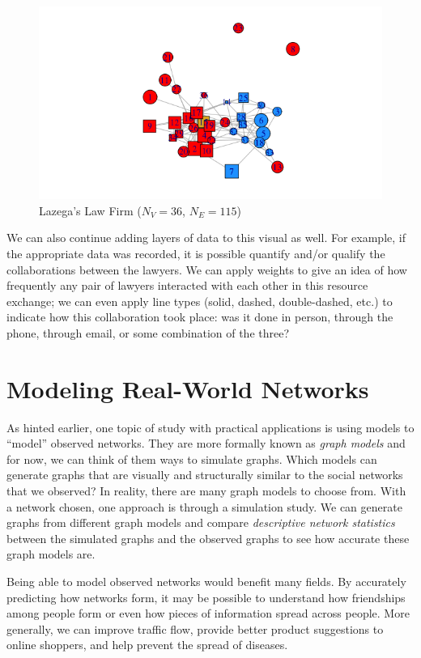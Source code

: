 \documentclass[12pt,twoside]{amherstthesis}
\begin{document}
  \begin{figure}[htbp]
  \centering
  \includegraphics{figure/02lawyerplot.png}
  \caption{Lazega's Law Firm (\(N_V = 36\), \(N_E = 115\))}
  \end{figure}
  
  We can also continue adding layers of data to this visual as well. For
  example, if the appropriate data was recorded, it is possible quantify
  and/or qualify the collaborations between the lawyers. We can apply
  weights to give an idea of how frequently any pair of lawyers interacted
  with each other in this resource exchange; we can even apply line types
  (solid, dashed, double-dashed, etc.) to indicate how this collaboration
  took place: was it done in person, through the phone, through email, or
  some combination of the three?
  
  \section{Modeling Real-World
  Networks}\label{modeling-real-world-networks}
  
  As hinted earlier, one topic of study with practical applications is
  using models to ``model'' observed networks. They are more formally
  known as \emph{graph models} and for now, we can think of them ways to
  simulate graphs. Which models can generate graphs that are visually and
  structurally similar to the social networks that we observed? In
  reality, there are many graph models to choose from. With a network
  chosen, one approach is through a simulation study. We can generate
  graphs from different graph models and compare \emph{descriptive network
  statistics} between the simulated graphs and the observed graphs to see
  how accurate these graph models are.
  
  Being able to model observed networks would benefit many fields. By
  accurately predicting how networks form, it may be possible to
  understand how friendships among people form or even how pieces of
  information spread across people. More generally, we can improve traffic
  flow, provide better product suggestions to online shoppers, and help
  prevent the spread of diseases.
  
\end{document}
